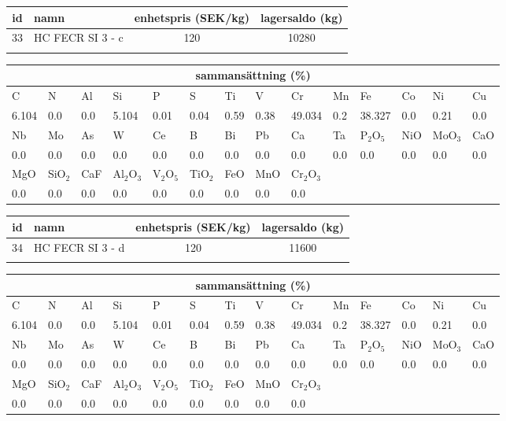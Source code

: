 \begin{center}
{\scriptsize\addtolength{\tabcolsep}{-3pt}
\begin{tabular}{clcc}
id&namn&enhetspris (SEK/kg)&lagersaldo (kg)\\
\hline
33&HC FECR SI 3 - c&120&10280\\\\
\end{tabular}
\begin{tabular}{llllllllllllll}
\multicolumn{14}{c}{sammansättning (\%)}\\
\hline
C&N&Al&Si&P&S&Ti&V&Cr&Mn&Fe&Co&Ni&Cu\\
\hline
6.104&0.0&0.0&5.104& 0.01&0.04&0.59&0.38& 49.034&0.2&38.327&0.0& 0.21&0.0\\
\hline
Nb&Mo&As&W&Ce&B&Bi&Pb&Ca&Ta&P$_2$O$_5$&NiO&MoO$_3$&CaO\\
\hline
0.0& 0.0& 0.0& 0.0& 0.0& 0.0& 0.0& 0.0& 0.0& 0.0& 0.0& 0.0& 0.0& 0.0\\
\hline
MgO&SiO$_2$&CaF&Al$_2$O$_3$&V$_2$O$_5$&TiO$_2$&FeO&MnO&Cr$_2$O$_3$\\
\hline
0.0& 0.0& 0.0& 0.0& 0.0& 0.0& 0.0& 0.0& 0.0\\
\end{tabular}
}
\end{center}

\begin{center}
{\scriptsize\addtolength{\tabcolsep}{-3pt}
\begin{tabular}{clcc}
id&namn&enhetspris (SEK/kg)&lagersaldo (kg)\\
\hline
34&HC FECR SI 3 - d&120&11600\\\\
\end{tabular}
\begin{tabular}{llllllllllllll}
\multicolumn{14}{c}{sammansättning (\%)}\\
\hline
C&N&Al&Si&P&S&Ti&V&Cr&Mn&Fe&Co&Ni&Cu\\
\hline
6.104&0.0&0.0&5.104& 0.01&0.04&0.59&0.38& 49.034&0.2&38.327&0.0& 0.21&0.0\\
\hline
Nb&Mo&As&W&Ce&B&Bi&Pb&Ca&Ta&P$_2$O$_5$&NiO&MoO$_3$&CaO\\
\hline
0.0& 0.0& 0.0& 0.0& 0.0& 0.0& 0.0& 0.0& 0.0& 0.0& 0.0& 0.0& 0.0& 0.0\\
\hline
MgO&SiO$_2$&CaF&Al$_2$O$_3$&V$_2$O$_5$&TiO$_2$&FeO&MnO&Cr$_2$O$_3$\\
\hline
0.0& 0.0& 0.0& 0.0& 0.0& 0.0& 0.0& 0.0& 0.0\\
\end{tabular}
}
\end{center}


